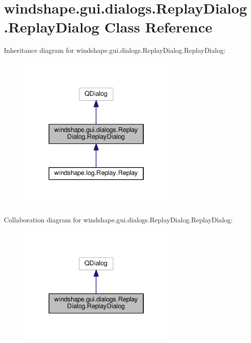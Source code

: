 \hypertarget{classwindshape_1_1gui_1_1dialogs_1_1_replay_dialog_1_1_replay_dialog}{}\section{windshape.\+gui.\+dialogs.\+Replay\+Dialog.\+Replay\+Dialog Class Reference}
\label{classwindshape_1_1gui_1_1dialogs_1_1_replay_dialog_1_1_replay_dialog}


Inheritance diagram for windshape.\+gui.\+dialogs.\+Replay\+Dialog.\+Replay\+Dialog\+:\nopagebreak
\begin{figure}[H]
\begin{center}
\leavevmode
\includegraphics[width=226pt]{classwindshape_1_1gui_1_1dialogs_1_1_replay_dialog_1_1_replay_dialog__inherit__graph}
\end{center}
\end{figure}


Collaboration diagram for windshape.\+gui.\+dialogs.\+Replay\+Dialog.\+Replay\+Dialog\+:\nopagebreak
\begin{figure}[H]
\begin{center}
\leavevmode
\includegraphics[width=226pt]{classwindshape_1_1gui_1_1dialogs_1_1_replay_dialog_1_1_replay_dialog__coll__graph}
\end{center}
\end{figure}
